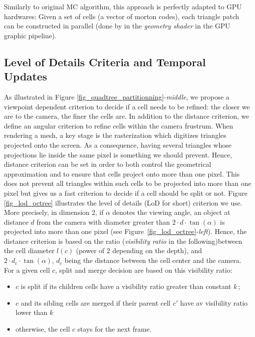 \documentclass{llncs}
\begin{document}
Similarly to original MC algorithm, this approach is perfectly adapted
to GPU hardwares: Given a set of cells (a vector of morton codes),
each triangle patch can be constructed in parallel (done by
in the \emph{geometry shader} in the GPU graphic pipeline).

\subsection{Level of Details Criteria and Temporal Updates}


As illustrated in Figure
\ref{fig_quadtree_partitionning}-\emph{middle}, we propose a viewpoint
dependent criterion to decide if a cell needs to be refined: the
closer we are to the camera, the finer the cells are. In addition to
the distance criterion, we define an angular criterion to refine cells
within the camera frustrum. When rendering a mesh, a key stage is the
rasterization which digitizes triangles projected onto the
screen. As a consequence, having several triangles whose projections
lie inside the same pixel is something we should prevent. Hence,
distance criterion can be set in order to both control the geometrical
approximation and to ensure that cells project onto more than one
pixel. This does not prevent all triangles within such cells to be
projected into more than one pixel but gives us a fast criterion to
decide if a cell should be split or not.  Figure \ref{fig_lod_octree}
illustrates the level of details (LoD for short) criterion we
use. More precisely, in dimension 2, if $\alpha$ denotes the viewing
angle, an object at distance $d$ from the camera with diameter greater than
 $2\cdot d\cdot\tan(\alpha)$
 is projected into more than one pixel
(see Figure~\ref{fig_lod_octree}-\emph{left}). Hence, the distance
criterion is based on the ratio (\emph{visibility ratio} in the
following)between the cell diameter $l(c)$ (power of 2 depending on
the depth), and
$2\cdot d_c\cdot\tan(\alpha)$, $d_c$ being the distance between the cell center and the camera. For a given cell $c$,
split and merge decision are based on this visibility ratio:
\begin{itemize}
\item $c$ is split if its children cells have a visibility ratio
  greater than  constant $k$\,;
\item $c$ and its sibling cells are merged if their parent cell $c'$
  have av visibility ratio lower than $k$\;
\item otherwise, the cell $c$ stays for the next frame.
\end{itemize}
\end{document}
